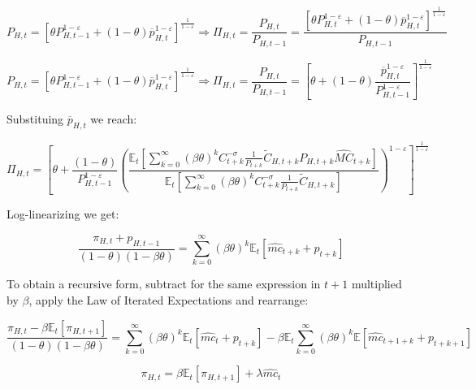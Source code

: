 \documentclass{article}
\newcommand{\Et}{\mathbb{E}_t}
\begin{document}
\begin{equation}
    P_{H,t} = [ \theta P_{H,t-1}^{1-\varepsilon} + (1-\theta) \overline{p}_{H,t}^{1-\varepsilon}]^\frac{1}{1-\varepsilon} \Rightarrow \Pi_{H,t} = \frac{P_{H,t}}{P_{H,t-1}} =  \frac{\left[ \theta P_{H,t}^{1-\varepsilon} + (1-\theta) \overline{p}_{H,t}^{1-\varepsilon}\right]^\frac{1}{1-\varepsilon}}{P_{H,t-1}} 
\end{equation}

\begin{equation}
    P_{H,t} = [ \theta P_{H,t-1}^{1-\varepsilon} + (1-\theta) \overline{p}_{H,t}^{1-\varepsilon}]^\frac{1}{1-\varepsilon} \Rightarrow \Pi_{H,t} = \frac{P_{H,t}}{P_{H,t-1}} =  \left[ \theta + (1-\theta) \frac{\overline{p}_{H,t}^{1-\varepsilon}}{P_{H,t-1}^{1-\varepsilon}} \right]^\frac{1}{1-\varepsilon} 
\end{equation}

Substituing $\overline{p}_{H,t}$ we reach:

\begin{equation}
    \Pi_{H,t} = \left[ \theta + \frac{(1-\theta)}{P_{H,t-1}^{1-\varepsilon}} \left(\frac{\Et\left[ \sum^\infty_{k=0} (\beta\theta)^k C_{t+k}^{-\sigma} \frac{1}{P_{t+k}}\tilde C_{H,t+k} P_{H,t+k} \widehat{MC}_{t+k}\right] }{\Et\left[ \sum^\infty_{k=0} (\beta\theta)^k C_{t+k}^{-\sigma} \frac{1}{P_{t+k}} \tilde C_{H,t+k}  \right]} \right)^{1-\varepsilon}\right]^\frac{1}{1-\varepsilon}
\end{equation}


Log-linearizing we get:

\begin{equation}
    \frac{\pi_{H,t} + p_{H,t-1}}{(1-\theta)(1-\beta \theta) } = \sum^\infty_{k=0} (\beta \theta)^k \Et[\widehat{mc}_{t+k} + p_{t+k}] 
\end{equation}

To obtain a recursive form, subtract for the same expression in $t+1$ multiplied by $\beta$, apply the Law of Iterated Expectations and rearrange:

\begin{equation}
    \frac{\pi_{H,t} - \beta \Et[\pi_{H,t+1}]}{(1-\theta)(1-\beta \theta) } = \sum^\infty_{k=0} (\beta \theta)^k \Et[\widehat{mc}_t + p_{t+k}]  - \beta \Et \sum^\infty_{k=0} (\beta \theta)^k  \mathbb E[\widehat{mc}_{t+1+k} + p_{t+k+1}] 
\end{equation}


\begin{equation}
    \pi_{H,t} = \beta \Et[\pi_{H,t+1}] + \lambda \widehat{mc}_t
\end{equation}
\end{document}
